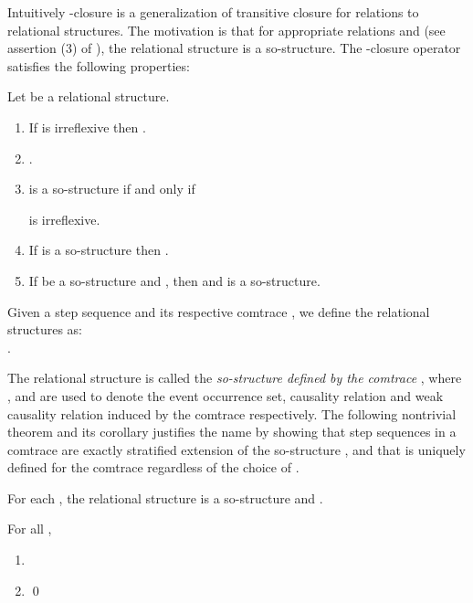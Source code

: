 \documentclass{llncs}
\begin{document}
Intuitively -closure is a generalization of transitive closure for relations to relational structures. The motivation is that for appropriate  relations  and  (see assertion (3) of ), the relational structure  is a so-structure. The -closure operator satisfies the following properties:

\begin{proposition}[\cite{JK95}]
Let  be a relational structure.
\begin{enumerate}
\item If  is irreflexive then .
\item .
\item  is a so-structure if and only if 

is irreflexive.
\item If  is a so-structure then .
\item If  be a so-structure and , then  and  is a so-structure. \hspace{-5mm}
\END
\end{enumerate}
\label{prop:so-cl}
\end{proposition}


\begin{definition}
Given a step sequence   and its respective comtrace , we define the relational structures  as: \\
\mbox{\hspace{3.5cm}}.\EOD
\label{def:s2sos}
\end{definition}

The relational structure  is called the \emph{so-structure defined by the comtrace} , where ,   and  are used to denote the event occurrence set, causality relation and weak causality relation induced by the comtrace  respectively.  The following nontrivial theorem and its corollary justifies the name by showing that  step sequences in a comtrace  are exactly stratified extension of the so-structure , and that  is uniquely defined for the comtrace  regardless of the choice of . 

\begin{theorem}[\cite{JK95}]
For each , the relational structure  is a so-structure and . \END
\label{theo:com2sos}
\end{theorem}

\begin{corollary} For all ,
\begin{enumerate}
\item 
\item  
\qed
\end{enumerate}
\label{cor:com2sos}
\end{corollary}
\end{document}
